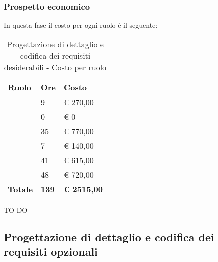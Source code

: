 		\subsubsection{Prospetto economico} %
		\label{ssub:prospetto_economico}
		In questa fase il costo per ogni ruolo è il seguente: \\
				\begin{table}[!h]
					\begin{center}
						\begin{tabularx}{0.65\textwidth}{|l|l|X|}
							\hline
							\textbf{Ruolo} & \textbf{Ore} & \textbf{Costo} \\
							\hline
							\roleProjectManager & 9 & \euro{} 270,00 \\
							\hline
							\roleAnalyst & 0 & \euro{} 0 \\
							\hline
							\roleDesigner & 35 & \euro{} 770,00 \\
							\hline
							\roleAdministrator & 7 & \euro{} 140,00 \\
							\hline
							\roleProgrammer & 41 & \euro{} 615,00 \\
							\hline
							\roleVerifier & 48 & \euro{} 720,00 \\
							\hline
							\textbf{Totale} & \textbf{139} & \textbf{\euro{} 2515,00} \\
							\hline
						\end{tabularx}
					\end{center}
				\caption{Progettazione di dettaglio e codifica dei requisiti desiderabili - Costo per ruolo}
				\end{table}

			\noindent
			TO DO
		
	
	\subsection{Progettazione di dettaglio e codifica dei requisiti opzionali} %
	\label{sub:progettazione_di_dettaglio_e_codifica_dei_requisiti_opzionali}
